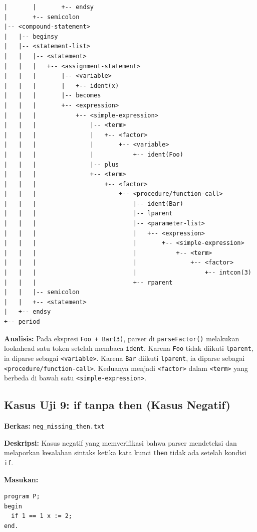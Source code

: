 \documentclass[12pt,a4paper]{article}
\begin{document}
\begin{lstlisting}[style=default]
|       |       +-- endsy
|       +-- semicolon
|-- <compound-statement>
|   |-- beginsy
|   |-- <statement-list>
|   |   |-- <statement>
|   |   |   +-- <assignment-statement>
|   |   |       |-- <variable>
|   |   |       |   +-- ident(x)
|   |   |       |-- becomes
|   |   |       +-- <expression>
|   |   |           +-- <simple-expression>
|   |   |               |-- <term>
|   |   |               |   +-- <factor>
|   |   |               |       +-- <variable>
|   |   |               |           +-- ident(Foo)
|   |   |               |-- plus
|   |   |               +-- <term>
|   |   |                   +-- <factor>
|   |   |                       +-- <procedure/function-call>
|   |   |                           |-- ident(Bar)
|   |   |                           |-- lparent
|   |   |                           |-- <parameter-list>
|   |   |                           |   +-- <expression>
|   |   |                           |       +-- <simple-expression>
|   |   |                           |           +-- <term>
|   |   |                           |               +-- <factor>
|   |   |                           |                   +-- intcon(3)
|   |   |                           +-- rparent
|   |   |-- semicolon
|   |   +-- <statement>
|   +-- endsy
+-- period
\end{lstlisting}

\textbf{Analisis:} Pada ekspresi \texttt{Foo + Bar(3)}, parser di \texttt{parseFactor()} melakukan lookahead satu token setelah membaca \texttt{ident}. Karena \texttt{Foo} tidak diikuti \texttt{lparent}, ia diparse sebagai \texttt{<variable>}. Karena \texttt{Bar} diikuti \texttt{lparent}, ia diparse sebagai \texttt{<procedure/function-call>}. Keduanya menjadi \texttt{<factor>} dalam \texttt{<term>} yang berbeda di bawah satu \texttt{<simple-expression>}.

\subsection{Kasus Uji 9: if tanpa then (Kasus Negatif)}
\textbf{Berkas:} \texttt{neg\_missing\_then.txt}

\textbf{Deskripsi:} Kasus negatif yang memverifikasi bahwa parser mendeteksi dan melaporkan kesalahan sintaks ketika kata kunci \texttt{then} tidak ada setelah kondisi \texttt{if}.

\textbf{Masukan:}
\begin{lstlisting}[style=default]
program P;
begin
  if 1 == 1 x := 2;
end.
\end{lstlisting}
\end{document}
